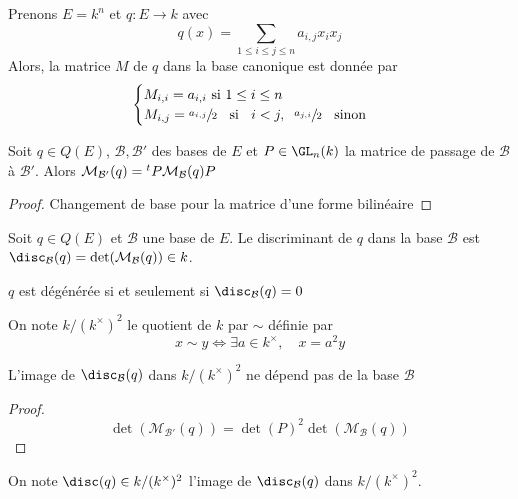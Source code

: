 \begin{ex}
    Prenons $E=k^n$ et  $q:E \longrightarrow k$ avec \[q(x)=\sum_{1\leq i\leq j\leq n}a_{i,j}x_ix_j\]
    Alors, la matrice $M$ de $q$ dans la base canonique est donnée par \[
    \begin{cases}
        M_{i,i}=a_{i,i}\text{ si }1\leq i\leq n\\
        M_{i,j}= \sfrac{a_{i,j}}2 \;\;\text{ si }\;\;i<j, \;\;\sfrac{a_{j,i}}2\;\;\text{ sinon }
    \end{cases}
    \] 
\end{ex}

\begin{prop}
    Soit $q \in  Q(E)$, $\mathcal  B, \mathcal  B'$ des bases de $E$ et $P \in  \GL_n(k)$ la matrice de passage de $\mathcal  B$ à $\mathcal  B'$. Alors $ \mathcal  M_{\mathcal  B'}(q)={}^t P\mathcal M_{\mathcal  B}(q)P$
\end{prop}

\begin{proof}
Changement de base pour la matrice d'une forme bilinéaire
\end{proof}

\begin{dfn}
    Soit $q \in  Q(E)$ et $\mathcal  B$ une base de $E$. Le discriminant de  $q$ dans la base  $\mathcal  B$ est $\disc_{\mathcal  B}(q)=\det(\mathcal  M_{\mathcal  B}(q)) \in  k$.
\end{dfn}

\begin{rem}
    $q$ est dégénérée  si et seulement si $\disc_{\mathcal  B}(q)=0$
\end{rem}

\begin{dfn}
    On note $k /(k^\times)^2$ le quotient de $k$ par  $\sim$ définie par  \[
    x\sim y \iff  \exists  a \in  k^\times, \quad  x=a^2y
    \]
\end{dfn}

\begin{prop}
    L'image de $\disc_{\mathcal  B}(q)$ dans $k / (k^\times)^2 $ ne dépend pas de la base $ \mathcal B$
\end{prop}

\begin{proof}
 \[
     \det(\mathcal  M_{\mathcal  B'}(q))=\det(P)^2 \det (\mathcal  M_{\mathcal  B}(q))
\] 
\end{proof}

\begin{dfn}
    On note $\disc(q) \in  k / (k^\times)^2 $ l'image de $\disc_{\mathcal  B}(q)$ dans $k / (k^\times )^2 $.
\end{dfn}

